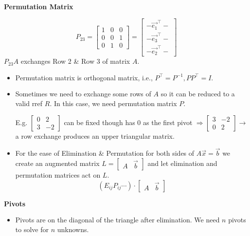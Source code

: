\documentclass[14pt]{article}
\theoremstyle{definition}
\theoremstyle{remark}
\begin{document}
\begin{multicols}{2}
    \textbf{Permutation Matrix}

    $$
        P_{23}=\left[\begin{array}{lll}
                1 & 0 & 0 \\
                0 & 0 & 1 \\
                0 & 1 & 0
            \end{array}\right]=\left[\begin{array}{c}
                -{\vec{e_1}}^{\top}- \\
                -{\vec{e_3}}^{\top}- \\
                -{\vec{e_2}}^{\top}-
            \end{array}\right]
    $$
    $P_{23} A$ exchanges Row 2 \& Row 3 of matrix $A$.
    \begin{itemize}
        \item Permutation matrix is orthogonal matrix, i.e., $P^\top = P^{-1}, PP^\top = I$.
        \item Sometimes we need to exchange some rows of $A$ so it can be reduced to a valid rref $R$. In this case, we need permutation matrix $P$.

              E.g. $\begin{bmatrix}0 & 2  \\
               3 & -2
                  \end{bmatrix}$ can be fixed though has 0 as the first pivot
              $\Rightarrow\left[\begin{array}{cc}3 & -2 \\ 0 & 2\end{array}\right] \rightarrow$ a row exchange produces an upper triangular matrix.
        \item For the ease of Elimination \& Permutation for both sides of $A \vec{x}=\vec{b}$ we create an augmented matrix $L = \begin{bmatrix}A & \vec{b}\end{bmatrix}$ and let elimination and permutation matrices act on $L$.
              $$
                  \left(E_{i j} P_{i j} \cdots \right) \cdot\begin{bmatrix}A & \vec{b}\end{bmatrix}
              $$
    \end{itemize}

    \textbf{Pivots}
    \begin{itemize}
        \item Pivots are on the diagonal of the triangle after elimination.
              We need $n$ pivots to solve for $n$ unknowns.
    \end{itemize}

\end{multicols}
\end{document}
